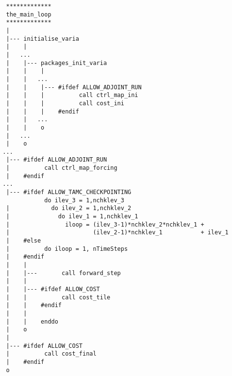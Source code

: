 
{\small
\begin{verbatim}
   *************
   the_main_loop
   *************
   |
   |--- initialise_varia
   |    |
   |   ...
   |    |--- packages_init_varia
   |    |    |
   |    |   ...
   |    |    |--- #ifdef ALLOW_ADJOINT_RUN
   |    |    |          call ctrl_map_ini
   |    |    |          call cost_ini
   |    |    |    #endif
   |    |   ...
   |    |    o
   |   ...
   |    o
  ...
   |--- #ifdef ALLOW_ADJOINT_RUN
   |          call ctrl_map_forcing
   |    #endif
  ...
   |--- #ifdef ALLOW_TAMC_CHECKPOINTING
              do ilev_3 = 1,nchklev_3
   |            do ilev_2 = 1,nchklev_2
   |              do ilev_1 = 1,nchklev_1
   |                iloop = (ilev_3-1)*nchklev_2*nchklev_1 +
   |                        (ilev_2-1)*nchklev_1           + ilev_1
   |    #else
   |          do iloop = 1, nTimeSteps
   |    #endif
   |    |
   |    |---       call forward_step
   |    |
   |    |--- #ifdef ALLOW_COST
   |    |          call cost_tile
   |    |    #endif
   |    |
   |    |    enddo
   |    o
   |
   |--- #ifdef ALLOW_COST
   |          call cost_final
   |    #endif
   o
\end{verbatim}
}

